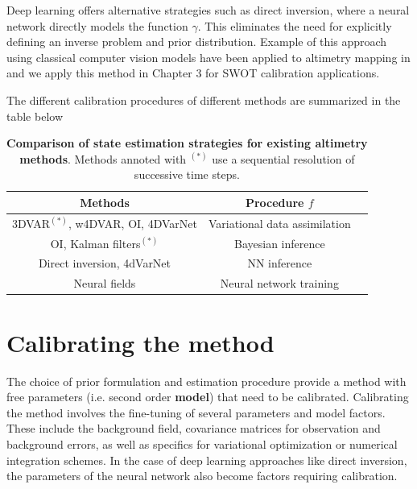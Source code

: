 \begin{bibunit}
Deep learning offers alternative strategies such as direct inversion, where a neural network directly models the function $\gamma$. This eliminates the need for explicitly defining an inverse problem and prior distribution. Example of this approach using classical computer vision models have been applied to altimetry mapping in \cite{manucharyanDeepLearningApproach2021a} and we apply this method in Chapter 3 for SWOT calibration applications.


The different calibration procedures of different methods are summarized in the table below 

\begin{table}
  \centering
  \begin{tabular}{|c|c|c|}
\hline
    Methods & Procedure $f$ \\
\hline
    3DVAR$^{(*)}$, w4DVAR, OI, 4DVarNet & Variational data assimilation \\
    OI, Kalman filters$^{(*)}$ & Bayesian inference \\
    Direct inversion, 4dVarNet & NN inference \\
    Neural fields & Neural network training \\
\hline
\end{tabular}
\caption{\textbf{Comparison of state estimation strategies for existing altimetry methods}. Methods annoted with $^{(*)}$ use a sequential resolution of successive time steps.}
\end{table}

%




\section{Calibrating the method}
  \label{c2sec:calib}
The choice of prior formulation and estimation procedure provide a method with free parameters (i.e. second order \textbf{model}) that need to be calibrated. 
Calibrating the method involves the fine-tuning of several parameters and model factors. These include the background field, covariance matrices for observation and background errors, as well as specifics for variational optimization or numerical integration schemes. In the case of deep learning approaches like direct inversion, the parameters of the neural network also become factors requiring calibration.



\end{bibunit}
